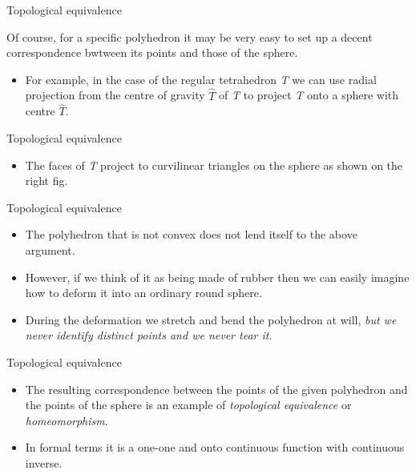 \documentclass{beamer}
\begin{document}
\begin{frame}{Topological equivalence}
  \begin{block}{}
    Of course, for a specific polyhedron it may be very easy to set up a decent correspondence bwtween its points and those of the sphere.
    \begin{itemize}
    \item For example, in the case of the regular tetrahedron \textsl{T} we can use radial projection from the centre of gravity $\hat T$ of \textsl{T} to project \textsl{T} onto a sphere with centre $\hat T$.
    \end{itemize}
  \end{block}
\end{frame}

\begin{frame}{Topological equivalence}
  \begin{block}{}
    \begin{itemize}
    \item The faces of \textsl{T} project to curvilinear triangles on the sphere as shown on the right fig.
    \end{itemize}
  \end{block}
\end{frame}

\begin{frame}{Topological equivalence}
  \begin{block}{}
    \begin{itemize}
    \item The polyhedron that is not convex does not lend itself to the above argument.
    \item However, if we think of it as being made of rubber then we can easily imagine how to deform it into an ordinary round sphere.
    \item During the deformation we stretch and bend the polyhedron at will, \textsl{but we never identify distinct points and we never tear it}.
    \end{itemize}
  \end{block}
\end{frame}

\begin{frame}{Topological equivalence}
  \begin{block}{}
    \begin{itemize}
    \item The resulting correspondence between the points of the given polyhedron and the points of the sphere is an example of \textsl{topological equivalence} or \textsl{homeomorphism}.
    \item In formal terms it is a one-one and onto continuous function with continuous inverse.
    \end{itemize}
  \end{block}
\end{frame}
\end{document}
